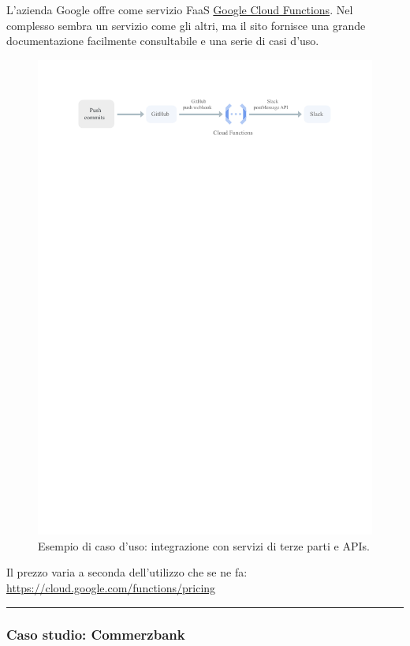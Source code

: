 \documentclass[a4paper]{article}
\newcommand{\longline}{\noindent\rule{\textwidth}{0.4pt}}
\begin{document}
	L'azienda Google offre come servizio FaaS \href{https://cloud.google.com/functions/}{Google Cloud Functions}. Nel complesso sembra un servizio come gli altri, ma il sito fornisce una grande documentazione facilmente consultabile e una serie di casi d'uso.
	\begin{figure}[!htp]
		\centering
		\includegraphics[width=\textwidth]{img/Google-1.pdf}
		\caption{Esempio di caso d'uso: integrazione con servizi di terze parti e APIs.}
	\end{figure}
	
	\noindent
	Il prezzo varia a seconda dell'utilizzo che se ne fa: \url{https://cloud.google.com/functions/pricing}
	
	\longline
	
	\subsubsection{Caso studio: Commerzbank}
	
\end{document}
